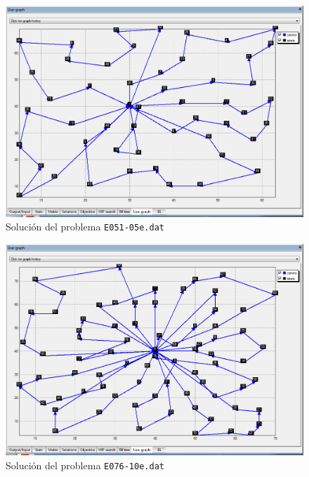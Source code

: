 \documentclass[a4paper,11pt]{article}
\begin{document}
\begin{figure}[!htbp]
	\centering
	\includegraphics[width=1.0\textwidth, height=0.4\textheight]{e051_redes.png}
    \caption{Solución del problema \texttt{E051-05e.dat}}
\end{figure}

\begin{figure}[!htbp]
	\centering
	\includegraphics[width=1.0\textwidth, height=0.4\textheight]{e076_redes.png}
    \caption{Solución del problema \texttt{E076-10e.dat}}
\end{figure}
\end{document}
